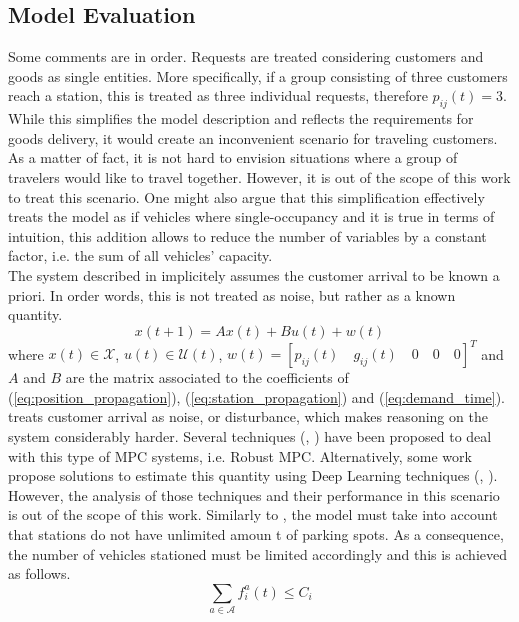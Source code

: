 \subsection{Model Evaluation}
Some comments are in order. Requests are treated considering customers and goods as single entities. More specifically, if a group consisting of three customers reach a station, this is treated as three individual requests, therefore $p_{ij}(t) = 3$. While this simplifies the model description and reflects the requirements for goods delivery, it would create an inconvenient scenario for traveling customers. As a matter of fact, it is not hard to envision situations where a group of travelers would like to travel together. However, it is out of the scope of this work to treat this scenario. One might also argue that this simplification effectively treats the model as if vehicles where single-occupancy and it is true in terms of intuition, this addition allows to reduce the number of variables by a constant factor, i.e. the sum of all vehicles' capacity. \\
The system described in  implicitely assumes the customer arrival to be known a priori. In order words, this is not treated as noise, but rather as a known quantity. 
\begin{equation}
	x(t+1) = Ax(t) + Bu(t) + w(t)\label{eq:disturbed_mpc_formulation}
\end{equation}
where $x(t) \in \mathcal{X}$, $u(t) \in \mathcal{U}(t)$, $w(t) = [p_{ij}(t)\quad g_{ij}(t)\quad0\quad0 \quad0]^T$ and $A$ and $B$ are the matrix associated to the coefficients of (\ref{eq:position_propagation}), (\ref{eq:station_propagation}) and (\ref{eq:demand_time}). \\
 treats customer arrival as noise, or disturbance, which makes reasoning on the system considerably harder. Several techniques (\cite{Campo1987RobustMP}, \cite{LANGSON2004125}) have been proposed to deal with this type of MPC systems, i.e. Robust MPC.  Alternatively, some work propose solutions to estimate this quantity using Deep Learning techniques (\cite{9202791}, \cite{8569427}).
However, the analysis of those techniques and their performance in this scenario is out of the scope of this work.
Similarly to , the model must take into account that stations do not have unlimited amoun t of parking spots. As a consequence, the number of vehicles stationed must be limited accordingly and this is achieved as follows. 
\begin{equation}
	\sum_{a \in \mathcal{A}}f^a_i(t) \leq C_i
	\label{eq:parking_limit}
\end{equation}
